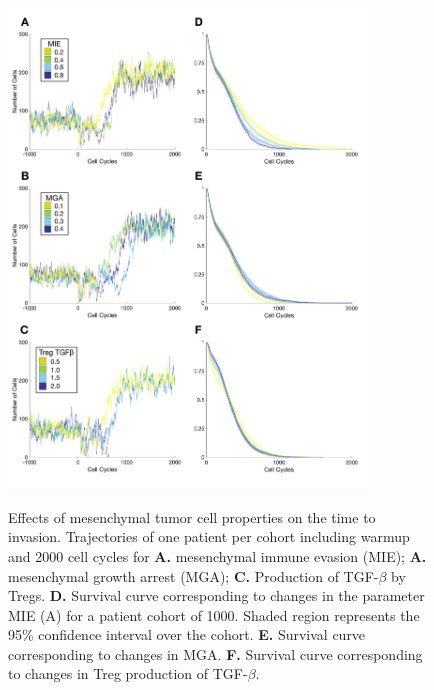 \documentclass[11pt]{article}
\begin{document}
\begin{figure}
\center
{\includegraphics[width=0.85\textwidth]{Figure3/Figure3.pdf}}
\caption{Effects of mesenchymal tumor cell properties on the time to invasion. Trajectories of one patient per cohort including warmup and 2000 cell cycles for {\bf A.} mesenchymal immune evasion (MIE); {\bf A.} mesenchymal growth arrest (MGA); {\bf C.} Production of TGF-$\beta$ by Tregs.
{\bf D.} Survival curve corresponding to changes in the parameter MIE (A) for a patient cohort of 1000. Shaded region represents the 95\% confidence interval over the cohort. 
{\bf E.} Survival curve corresponding to changes in MGA.
{\bf F.} Survival curve corresponding to changes in Treg production of TGF-$\beta$. }
\label{fig:FirstSurvivalCurves}
\end{figure}
\end{document}
